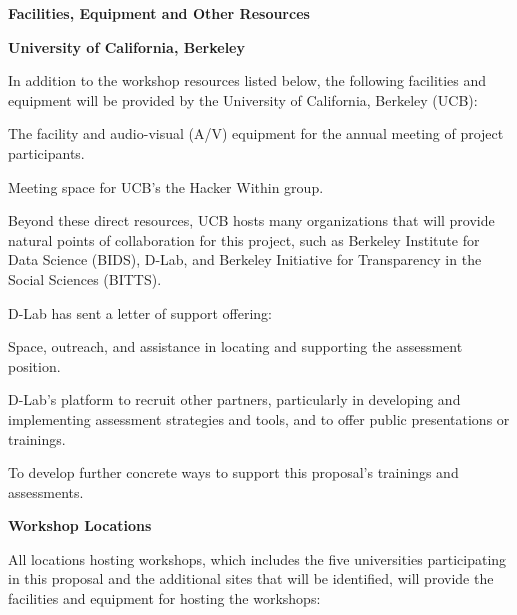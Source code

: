 \documentclass{proposalnsf}
\newlength{\up}
\begin{document}
\begin{center}
\large\textbf{Facilities, Equipment and Other Resources}
\end{center}

\textbf{University of California, Berkeley}

In addition to the workshop resources listed below, the following
facilities and equipment will be provided by the University of
California, Berkeley (UCB):

\begin{compactitem}

\item
  The facility and audio-visual (A/V) equipment for the annual meeting
  of project participants.

\item
  Meeting space for UCB's the Hacker Within group.

\end{compactitem}

Beyond these direct resources, UCB hosts many organizations that will
provide natural points of collaboration for this project, such as
Berkeley Institute for Data Science (BIDS), D-Lab, and Berkeley
Initiative for Transparency in the Social Sciences (BITTS).

D-Lab has sent a letter of support offering:

\begin{compactitem}

\item
  Space, outreach, and assistance in locating and supporting the
  assessment position.

\item
  D-Lab's platform to recruit other partners, particularly in
  developing and implementing assessment strategies and tools, and to
  offer public presentations or trainings.

\item
  To develop further concrete ways to support this proposal's
  trainings and assessments.

\end{compactitem}

\textbf{Workshop Locations}

All locations hosting workshops, which includes the five universities
participating in this proposal and the additional sites that will be
identified, will provide the facilities and equipment for hosting the
workshops:
\end{document}
